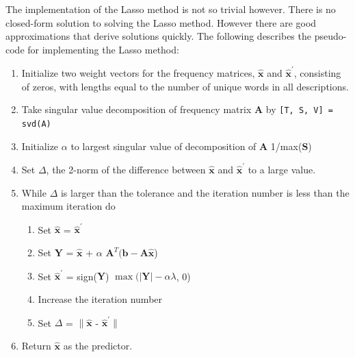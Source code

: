 \documentclass[12pt]{article}
\begin{document}
    The implementation of the Lasso method is not so trivial however. There is
    no closed-form solution to solving the Lasso method. However there are good
    approximations that derive solutions quickly. The following describes the
    pseudo-code for implementing the Lasso method:

        \begin{enumerate}
            
            \item Initialize two weight vectors for the frequency matrices,
                $\hat{\bm{x}}$ and $\hat{\bm{x}}^\prime$, consisting of zeros,
                with lengths equal to the number of unique words in all
                descriptions.

            \item Take singular value decomposition of frequency matrix
                $\bm{A}$ by \texttt{[T, S, V] = svd(A)}

            \item Initialize $\alpha$ to largest singular value of
                decomposition of $\bm{A}$ 1/max($\bm{S}$)

            \item Set $\Delta$, the 2-norm of the difference between
                $\hat{\bm{x}}$ and $\hat{\bm{x}}^\prime$ to a large value.
                
            \item While $\Delta$ is larger than the tolerance and the iteration
                number is less than the maximum iteration do

                \begin{enumerate}

                    \item Set $\hat{\bm{x}}$ = $\hat{\bm{x}}^\prime$
                    
                    \item Set $\bm{Y}$ = $\hat{\bm{x}}$ + $\alpha$ $\bm{A}^T
                        (\bm{b - A} \hat{\bm{x}}$)

                    \item Set $\hat{\bm{x}}^\prime$ = sign($\bm{Y}$)
                        $\max(|\bm{Y}| - \alpha \lambda$, 0)

                    \item Increase the iteration number

                    \item Set $\Delta$ = $\|\hat{\bm{x}}$ -
                        $\hat{\bm{x}}^\prime\|$

                \end{enumerate}

            \item Return $\hat{\bm{x}}$ as the predictor.

        \end{enumerate}
\end{document}
